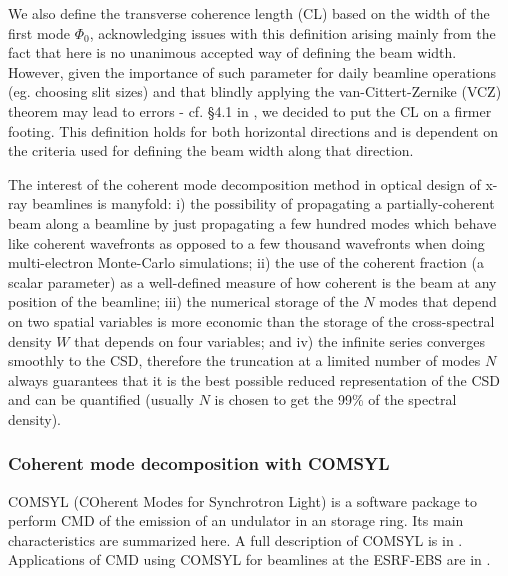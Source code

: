 \documentclass{iucr}              %
\newcommand{\todo}[1]{{\color{red}[TODO: "#1'']}}
\begin{document}
We also define the transverse coherence length (CL) based on the width of the first mode $\Phi_0$, acknowledging issues with this definition arising mainly from the fact that here is no unanimous accepted way of defining the beam width. However, given the importance of such parameter for daily beamline operations (eg. choosing slit sizes) and that blindly applying the van-Cittert-Zernike (VCZ) theorem may lead to errors - cf. §4.1 in \cite{geloni2008}, we decided to put the CL on a firmer footing. This definition holds for both horizontal directions and is dependent on the criteria used for defining the beam width along that direction. %

The interest of the coherent mode decomposition method in optical design of x-ray beamlines is manyfold: i) the possibility of propagating a partially-coherent beam along a beamline by just propagating a few hundred modes which behave like coherent wavefronts as opposed to a few thousand wavefronts when doing multi-electron Monte-Carlo simulations; ii) the use of the coherent fraction (a scalar parameter) as a well-defined measure of how coherent is the beam at any position of the beamline; iii) the numerical storage of the $N$ modes that depend on two spatial variables is more economic than the storage of the cross-spectral density $W$ that depends on four variables; and iv) the infinite series converges smoothly to the CSD, therefore the truncation at a limited number of modes $N$ always guarantees that it is the best possible reduced representation of the CSD and can be quantified (usually $N$ is chosen to get the 99\% of the spectral density). 

\subsubsection{Coherent mode decomposition with COMSYL} 

COMSYL (COherent Modes for Synchrotron Light) \cite{codeCOMSYL} is a software package to perform CMD of the emission of an undulator in an storage ring. Its main characteristics are summarized here. A full description of COMSYL is in \cite{glassThesis}. Applications of CMD using COMSYL for beamlines at the ESRF-EBS are in \cite{glass2017, hierarchical}. 
\end{document}
